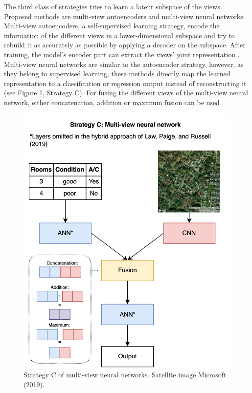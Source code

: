 \documentclass[letterpaper]{article} %
\begin{document}
The third class of strategies tries to learn a latent subspace of the views. Proposed methods are multi-view autoencoders and multi-view neural networks. Multi-view autoencoders, a self-supervised learning strategy, encode the information of the different views in a lower-dimensional subspace and try to rebuild it as accurately as possible by applying a decoder on the subspace. After training, the model's encoder part can extract the views' joint representation \cite{li2018survey}. Multi-view neural networks are similar to the autoencoder strategy, however, as they belong to supervised learning, these methods directly map the learned representation to a classification or regression output instead of reconstructing it \cite{xu2013survey} (see Figure \ref{strategyC}, Strategy C). For fusing the different views of the multi-view neural network, either concatenation, addition or maximum fusion can be used \cite{li2018survey}.

\begin{figure}[t]
\centering
\includegraphics[width=0.9\columnwidth]{StrategyC.png} %
\caption{Strategy C of multi-view neural networks. Satellite image \textcopyright \space Microsoft (2019).}
\label{strategyC}
\end{figure}
\end{document}
